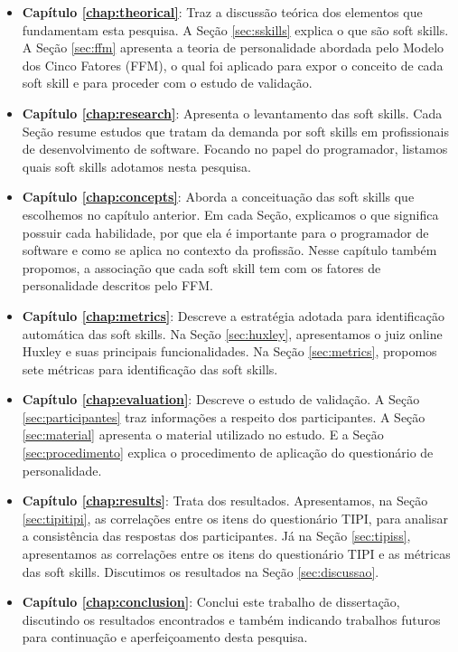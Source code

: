 \begin{itemize}

	\item \textbf{Capítulo \ref{chap:theorical}}: Traz a discussão teórica dos elementos que fundamentam esta pesquisa. A Seção \ref{sec:sskills} explica o que são soft skills. A Seção \ref{sec:ffm} apresenta a teoria de personalidade abordada pelo Modelo dos Cinco Fatores (FFM), o qual foi aplicado para expor o conceito de cada soft skill e para proceder com o estudo de validação.

	\item \textbf{Capítulo \ref{chap:research}}: Apresenta o levantamento das soft skills. Cada Seção resume estudos que tratam da demanda por soft skills em profissionais de desenvolvimento de software. Focando no papel do programador, listamos quais soft skills adotamos nesta pesquisa.

	\item \textbf{Capítulo \ref{chap:concepts}}: Aborda a conceituação das soft skills que escolhemos no capítulo anterior. Em cada Seção, explicamos o que significa possuir cada habilidade, por que ela é importante para o programador de software e como se aplica no contexto da profissão. Nesse capítulo também propomos, a associação que cada soft skill tem com os fatores de personalidade descritos pelo FFM.

	\item \textbf{Capítulo \ref{chap:metrics}}: Descreve a estratégia adotada para identificação automática das soft skills. Na Seção \ref{sec:huxley}, apresentamos o juiz online Huxley e suas principais funcionalidades. Na Seção \ref{sec:metrics}, propomos sete métricas para identificação das soft skills. 

	\item \textbf{Capítulo \ref{chap:evaluation}}: Descreve o estudo de validação. A Seção \ref{sec:participantes} traz informações a respeito dos participantes. A Seção \ref{sec:material} apresenta o material utilizado no estudo. E a Seção \ref{sec:procedimento} explica o procedimento de aplicação do questionário de personalidade.

	\item \textbf{Capítulo \ref{chap:results}}: Trata dos resultados. Apresentamos, na Seção \ref{sec:tipitipi}, as correlações entre os itens do questionário TIPI, para analisar a consistência das respostas dos participantes. Já na Seção \ref{sec:tipiss}, apresentamos as correlações entre os itens do questionário TIPI e as métricas das soft skills. Discutimos os resultados na Seção \ref{sec:discussao}.

	\item \textbf{Capítulo \ref{chap:conclusion}}: Conclui este trabalho de dissertação, discutindo os resultados encontrados e também indicando trabalhos futuros para continuação e aperfeiçoamento desta pesquisa.
	
\end{itemize}

